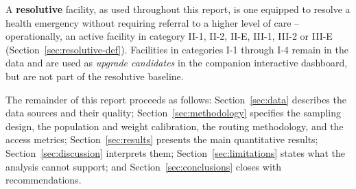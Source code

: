 A \textbf{resolutive} facility, as used throughout this report, is one equipped to resolve a health emergency without requiring referral to a higher level of care -- operationally, an active facility in category II-1, II-2, II-E, III-1, III-2 or III-E (Section~\ref{sec:resolutive-def}). Facilities in categories I-1 through I-4 remain in the data and are used as \emph{upgrade candidates} in the companion interactive dashboard, but are not part of the resolutive baseline.

The remainder of this report proceeds as follows: Section~\ref{sec:data} describes the data sources and their quality; Section~\ref{sec:methodology} specifies the sampling design, the population and weight calibration, the routing methodology, and the access metrics; Section~\ref{sec:results} presents the main quantitative results; Section~\ref{sec:discussion} interprets them; Section~\ref{sec:limitations} states what the analysis cannot support; and Section~\ref{sec:conclusions} closes with recommendations.
